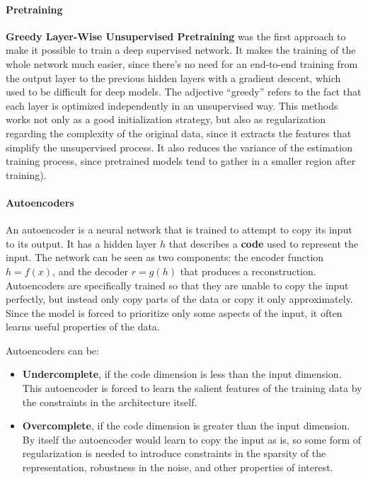 \paragraph{Pretraining}

\textbf{Greedy Layer-Wise Unsupervised Pretraining} was the first approach to make it possible to train a deep supervised network. It makes the training of the whole network much easier, since there's no need for an end-to-end training from the output layer to the previous hidden layers with a gradient descent, which used to be difficult for deep models. The adjective ``greedy'' refers to the fact that each layer is optimized independently in an unsupervised way. This methods works not only as a good initialization strategy, but also as regularization regarding the complexity of the original data, since it extracts the features that simplify the unsupervised process. It also reduces the variance of the estimation training process, since pretrained models tend to gather in a smaller region after training).

\paragraph{Autoencoders}

An autoencoder is a neural network that is trained to attempt to copy its input to its output. It has a hidden layer $h$ that describes a \textbf{code} used to represent the input. The network can be seen as two components: the encoder function $h = f(x)$, and the decoder $r = g(h)$ that produces a reconstruction. Autoencoders are specifically trained so that they are unable to copy the input perfectly, but instead only copy parts of the data or copy it only approximately. Since the model is forced to prioritize only some aspects of the input, it often learns useful properties of the data.

Autoencoders can be:
\begin{itemize}
    \item \textbf{Undercomplete}, if the code dimension is less than the input dimension. This autoencoder is forced to learn the salient features of the training data by the constraints in the architecture itself.

    \item \textbf{Overcomplete}, if the code dimension is greater than the input dimension. By itself the autoencoder would learn to copy the input as is, so some form of regularization is needed to introduce constraints in the sparsity of the representation, robustness in the noise, and other properties of interest.
\end{itemize}


